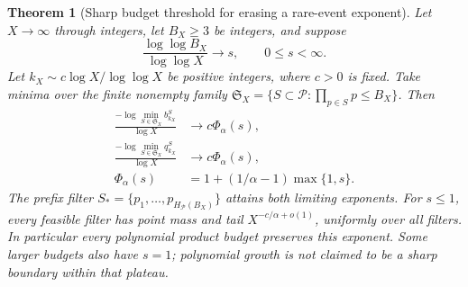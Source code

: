 \documentclass[11pt]{article}
\newtheorem{theorem}{Theorem}[section]
\theoremstyle{definition}
\begin{document}
\begin{theorem}[Sharp budget threshold for erasing a rare-event exponent]
\label{thm:thin-prime-filter-budget-phase}
Let $X\to\infty$ through integers, let $B_X\ge3$ be integers,
and suppose
\[
 \frac{\log\log B_X}{\log\log X}\longrightarrow s,
 \qquad 0\le s<\infty.
\]
Let $k_X\sim c\log X/\log\log X$ be positive integers,
where $c>0$ is fixed.
Take minima over the finite nonempty family
$\mathfrak S_X=\{S\subset\mathcal P:\prod_{p\in S}p\le B_X\}$.
Then
\begin{equation}
 \begin{aligned}
 \frac{-\log\min_{S\in\mathfrak S_X}b_{k_X}^S}{\log X}
     &\longrightarrow c\Phi_\alpha(s),\\
 \frac{-\log\min_{S\in\mathfrak S_X}q_{k_X}^S}{\log X}
     &\longrightarrow c\Phi_\alpha(s),\\
 \Phi_\alpha(s)&=1+(1/\alpha-1)\max\{1,s\}.
 \end{aligned}
 \label{eq:thin-prime-filter-budget-phase}
\end{equation}
The prefix filter $S_*=\{p_1,\ldots,p_{H_{\mathcal P}(B_X)}\}$
attains both limiting exponents.
For $s\le1$, every feasible filter has point mass and tail
$X^{-c/\alpha+o(1)}$, uniformly over all filters.
In particular every polynomial product budget preserves this exponent.
Some larger budgets also have $s=1$; polynomial growth is not
claimed to be a sharp boundary within that plateau.
\end{theorem}
\end{document}
